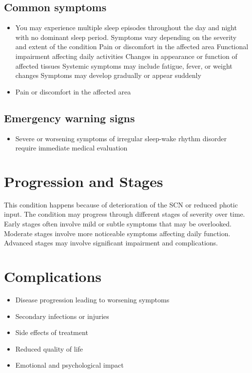 \subsection{Common symptoms}
\begin{itemize}[noitemsep]
  \item You may experience multiple sleep episodes throughout the day and night with no dominant sleep period. Symptoms vary depending on the severity and extent of the condition Pain or discomfort in the affected area Functional impairment affecting daily activities Changes in appearance or function of affected tissues Systemic symptoms may include fatigue, fever, or weight changes Symptoms may develop gradually or appear suddenly
  \item Pain or discomfort in the affected area
  \end{itemize}

\subsection{Emergency warning signs}
\begin{itemize}[noitemsep]
  \item Severe or worsening symptoms of irregular sleep-wake rhythm disorder require immediate medical evaluation
\end{itemize}
\section{Progression and Stages}
This condition happens because of deterioration of the SCN or reduced photic input. The condition may progress through different stages of severity over time. Early stages often involve mild or subtle symptoms that may be overlooked. Moderate stages involve more noticeable symptoms affecting daily function. Advanced stages may involve significant impairment and complications.
\section{Complications}
\begin{itemize}[noitemsep]
  \item Disease progression leading to worsening symptoms
  \item Secondary infections or injuries
  \item Side effects of treatment
  \item Reduced quality of life
  \item Emotional and psychological impact
\end{itemize}
